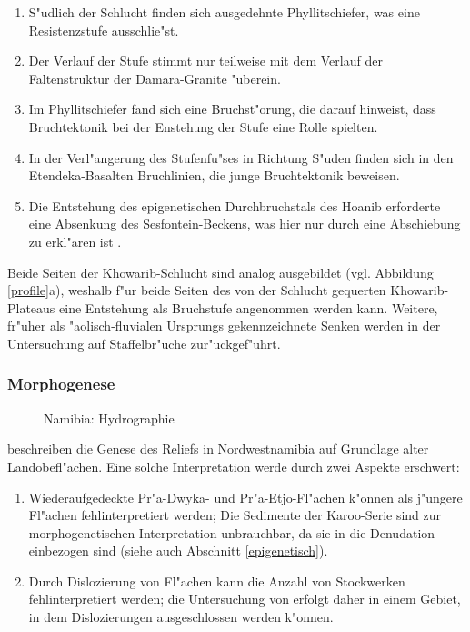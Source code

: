 \documentclass[titlepage,a4paper]{scrartcl}
\begin{document}
\begin{enumerate}

\item S"udlich der Schlucht finden sich ausgedehnte Phyllitschiefer, was eine Resistenzstufe ausschlie"st.
\item Der Verlauf der Stufe stimmt nur teilweise mit dem Verlauf der Faltenstruktur der Damara-Granite "uberein.
\item Im Phyllitschiefer fand sich eine Bruchst"orung, die darauf hinweist, dass Bruchtektonik bei der Enstehung der Stufe eine Rolle spielten.
\item In der Verl"angerung des Stufenfu"ses in Richtung S"uden finden sich in den Eten\-deka-Basalten Bruchlinien, die junge Bruchtektonik beweisen.
\item Die Entstehung des epigenetischen Durchbruchstals des Hoanib erforderte eine Absenkung des Sesfontein-Beckens, was hier nur durch eine Abschiebung zu erkl"aren ist \citep{BrunotteAndSpoenemann1997}.

\end{enumerate}

Beide Seiten der Khowarib-Schlucht sind analog ausgebildet (vgl. Abbildung \ref{profile}a), weshalb f"ur beide Seiten des von der Schlucht gequerten Khowarib-Plateaus eine Entstehung als Bruchstufe angenommen werden kann. Weitere, fr"uher als "aolisch-fluvialen Ursprungs gekennzeichnete Senken werden in der Untersuchung auf Staffelbr"uche zur"uckgef"uhrt.

\subsubsection{Morphogenese}

\begin{figure}
\begin{center}
\end{center}
\caption[Namibia: Hydrographie]{Namibia: Hydrographie }
\label{hydro-map}
\end{figure}

\cite{BrunotteAndSpoenemann1997} beschreiben die Genese des Reliefs in Nordwestnamibia auf Grundlage alter Landobefl"achen. Eine solche Interpretation werde durch zwei Aspekte erschwert:

\begin{enumerate}

\item Wiederaufgedeckte Pr"a-Dwyka- und Pr"a-Etjo-Fl"achen k"onnen als j"ungere Fl"achen fehlinterpretiert werden; Die Sedimente der Karoo-Serie sind zur morphogenetischen Interpretation unbrauchbar, da sie in die Denudation einbezogen sind (siehe auch Abschnitt \ref{epigenetisch}).
\item Durch Dislozierung von Fl"achen kann die Anzahl von Stockwerken fehlinterpretiert werden; die Untersuchung von \cite{BrunotteAndSpoenemann1997} erfolgt daher in einem Gebiet, in dem Dislozierungen ausgeschlossen werden k"onnen.

\end{enumerate}
\end{document}
